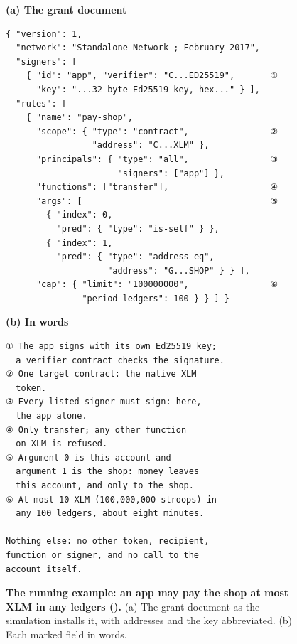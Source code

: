 \begin{figure}[tbp]
\centering
\begin{minipage}[t]{0.49\linewidth}\footnotesize\textbf{(a) The grant document}
\begin{Verbatim}[fontsize=\scriptsize,frame=single,framesep=1.5mm]
{ "version": 1,
  "network": "Standalone Network ; February 2017",
  "signers": [
    { "id": "app", "verifier": "C...ED25519",       ①
      "key": "...32-byte Ed25519 key, hex..." } ],
  "rules": [
    { "name": "pay-shop",
      "scope": { "type": "contract",                ②
                 "address": "C...XLM" },
      "principals": { "type": "all",                ③
                      "signers": ["app"] },
      "functions": ["transfer"],                    ④
      "args": [                                     ⑤
        { "index": 0,
          "pred": { "type": "is-self" } },
        { "index": 1,
          "pred": { "type": "address-eq",
                    "address": "G...SHOP" } } ],
      "cap": { "limit": "100000000",                ⑥
               "period-ledgers": 100 } } ] }
\end{Verbatim}
\end{minipage}\hfill
\begin{minipage}[t]{0.49\linewidth}\footnotesize\textbf{(b) In words}
\begin{Verbatim}[fontsize=\scriptsize,frame=single,framesep=1.5mm]
① The app signs with its own Ed25519 key;
  a verifier contract checks the signature.
② One target contract: the native XLM
  token.
③ Every listed signer must sign: here,
  the app alone.
④ Only transfer; any other function
  on XLM is refused.
⑤ Argument 0 is this account and
  argument 1 is the shop: money leaves
  this account, and only to the shop.
⑥ At most 10 XLM (100,000,000 stroops) in
  any 100 ledgers, about eight minutes.

Nothing else: no other token, recipient,
function or signer, and no call to the
account itself.
\end{Verbatim}
\end{minipage}
\caption{\textbf{The running example: an app may pay the shop at most  XLM in any  ledgers ().} (a) The grant document as the simulation installs it, with addresses and the key abbreviated. (b) Each marked field in words.}\label{fig:fig-shop-grant}
\end{figure}
